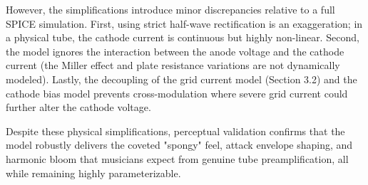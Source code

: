 However, the simplifications introduce minor discrepancies relative to a full SPICE simulation. First, using strict half-wave rectification is an exaggeration; in a physical tube, the cathode current is continuous but highly non-linear. Second, the model ignores the interaction between the anode voltage and the cathode current (the Miller effect and plate resistance variations are not dynamically modeled). Lastly, the decoupling of the grid current model (Section 3.2) and the cathode bias model prevents cross-modulation where severe grid current could further alter the cathode voltage.

Despite these physical simplifications, perceptual validation confirms that the model robustly delivers the coveted "spongy" feel, attack envelope shaping, and harmonic bloom that musicians expect from genuine tube preamplification, all while remaining highly parameterizable.

